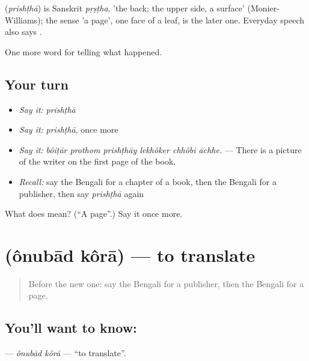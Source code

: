 \begin{cousinweb}
\textbf{} (\emph{prishṭhā}) is Sanskrit \emph{pṛṣṭha}, 'the back; the upper side, a surface' (Monier-Williams); the sense 'a page', one face of a leaf, is the later one. Everyday speech also says \textbf{}.
\end{cousinweb}

\begin{grammarlens}[title={What you've built}]
One more word for telling what happened.
\end{grammarlens}

\subsection*{Your turn}
\begin{itemize}
\raggedright
  \item \emph{Say it:} \emph{prishṭhā}
  \item \emph{Say it:} \emph{prishṭhā}, once more
  \item \emph{Say it:} \emph{bôiṭār prothom prishṭhāy lekhôker chhôbi āchhe.} — There is a picture of the writer on the first page of the book.
  \item \emph{Recall:} say the Bengali for a chapter of a book, then the Bengali for a publisher, then say \emph{prishṭhā} again
\end{itemize}

\begin{tcolorbox}[breakable,colback=teal!4,colframe=teal!35!black,title={Before you move on}]
What does  mean? (\textquotedblleft{}A page\textquotedblright{}.) Say it once more.
\end{tcolorbox}
\section[\texorpdfstring{\bn{অনুবাদ} \bn{করা} (ônubād kôrā)}{অনুবাদ করা (ônubād kôrā)}]{  (ônubād kôrā) — to translate}

\label{lesson:BN-C328-onubad-kora}



\begin{quote}
Before the new one: say the Bengali for a publisher, then the Bengali for a page.
\end{quote}

\subsection*{You'll want to know:  }
\textbf{ } — \emph{ônubād kôrā} — \textquotedblleft{}to translate\textquotedblright{}.

